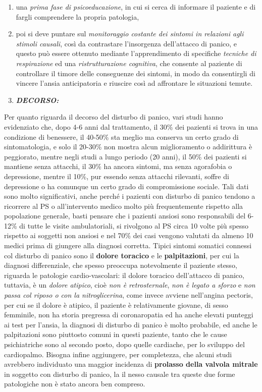 \documentclass[]{article}
\begin{document}
\begin{enumerate}
\def\labelenumi{\arabic{enumi}.}
\item
  una \emph{prima fase di psicoeducazione}, in cui si cerca di informare
  il paziente e di fargli comprendere la propria patologia,
\item
  poi si deve puntare sul \emph{monitoraggio costante dei sintomi in
  relazioni agli stimoli causali}, così da contrastare l'insorgenza
  dell'attacco di panico, e questo può essere ottenuto mediante
  l'apprendimento di specifiche \emph{tecniche di respirazione} ed una
  \emph{ristrutturazione cognitiva}, che consente al paziente di
  controllare il timore delle conseguenze dei sintomi, in modo da
  consentirgli di vincere l'ansia anticipatoria e riuscire così ad
  affrontare le situazioni temute.
\item
  \textbf{\emph{DECORSO:}}
\end{enumerate}

Per quanto riguarda il decorso del disturbo di panico, vari studi hanno
evidenziato che, dopo 4-6 anni dal trattamento, il 30\% dei pazienti si
trova in una condizione di benessere, il 40-50\% sta meglio ma conserva
un certo grado di sintomatologia, e solo il 20-30\% non mostra alcun
miglioramento o addirittura è peggiorato, mentre negli studi a lungo
periodo (20 anni), il 50\% dei pazienti si mantiene senza attacchi, il
30\% ha ancora sintomi, ma senza agorafobia o depressione, mentre il
10\%, pur essendo senza attacchi rilevanti, soffre di depressione o ha
comunque un certo grado di compromissione sociale. Tali dati sono molto
significativi, anche perché i pazienti con disturbo di panico tendono a
ricorrere al PS o all'intervento medico molto più frequentemente
rispetto alla popolazione generale, basti pensare che i pazienti ansiosi
sono responsabili del 6-12\% di tutte le visite ambulatoriali, si
rivolgono al PS circa 10 volte più spesso rispetto ai soggetti non
ansiosi e nel 70\% dei casi vengono valutati da almeno 10 medici prima
di giungere alla diagnosi corretta. Tipici sintomi somatici connessi col
disturbo di panico sono il \textbf{dolore toracico} e le
\textbf{palpitazioni}, per cui la diagnosi differenziale, che spesso
preoccupa notevolmente il paziente stesso, riguarda le patologie
cardio-vascolari: il dolore toracico dell'attacco di panico, tuttavia, è
un \emph{dolore atipico}, cioè \emph{non è retrosternale}, \emph{non è
legato a sforzo} e \emph{non passa col riposo o con la nitroglicerina},
come invece avviene nell'angina pectoris, per cui se il dolore è
atipico, il paziente è relativamente giovane, di sesso femminile, non ha
storia pregressa di coronaropatia ed ha anche elevati punteggi ai test
per l'ansia, la diagnosi di disturbo di panico è molto probabile, ed
anche le palpitazioni sono piuttosto comuni in questi paziente, tanto
che le cause psichiatriche sono al secondo posto, dopo quelle cardiache,
per lo sviluppo del cardiopalmo. Bisogna infine aggiungere, per
completezza, che alcuni studi avrebbero individuato una maggior
incidenza di \textbf{prolasso della valvola mitrale} in soggetto con
disturbo di panico, la il nesso causale tra queste due forme patologiche
non è stato ancora ben compreso.
\end{document}
